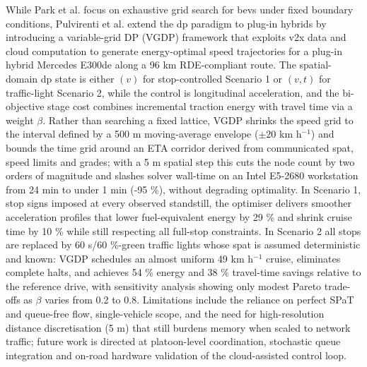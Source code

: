 While Park et al. focus on exhaustive grid search for \acp{bev} under fixed boundary conditions, Pulvirenti et al. \cite{Pulvirenti2023} extend the \ac{dp} paradigm to plug-in hybrids by introducing a variable-grid DP (VGDP) framework that exploits \ac{v2x} data and cloud computation to generate energy-optimal speed trajectories for a plug-in hybrid Mercedes E300de along a 96 km RDE-compliant route. The spatial-domain \ac{dp} state is either $(v)$ for stop-controlled Scenario 1 or $(v,t)$ for traffic-light Scenario 2, while the control is longitudinal acceleration, and the bi-objective stage cost combines incremental traction energy with travel time via a weight $\beta$. Rather than searching a fixed lattice, VGDP shrinks the speed grid to the interval defined by a 500 m moving-average envelope ($\pm20$ km h$^{-1}$) and bounds the time grid around an ETA corridor derived from communicated \ac{spat}, speed limits and grades; with a 5 m spatial step this cuts the node count by two orders of magnitude and slashes solver wall-time on an Intel E5-2680 workstation from 24 min to under 1 min (-95 \%), without degrading optimality. In Scenario 1, stop signs imposed at every observed standstill, the optimiser delivers smoother acceleration profiles that lower fuel-equivalent energy by 29 \% and shrink cruise time by 10 \% while still respecting all full-stop constraints. In Scenario 2 all stops are replaced by 60 s/60 \%-green traffic lights whose \ac{spat} is assumed deterministic and known: VGDP schedules an almost uniform 49 km h$^{-1}$ cruise, eliminates complete halts, and achieves 54 \% energy and 38 \% travel-time savings relative to the reference drive, with sensitivity analysis showing only modest Pareto trade-offs as $\beta$ varies from 0.2 to 0.8. Limitations include the reliance on perfect SPaT and queue-free flow, single-vehicle scope, and the need for high-resolution distance discretisation (5 m) that still burdens memory when scaled to network traffic; future work is directed at platoon-level coordination, stochastic queue integration and on-road hardware validation of the cloud-assisted control loop.
\mynewline
